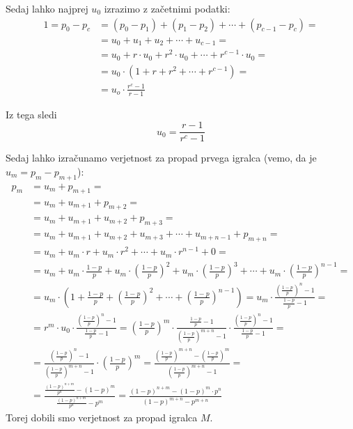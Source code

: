 \documentclass[12pt, a4paper]{article}
\begin{document}
Sedaj lahko najprej $u_0$ izrazimo z začetnimi podatki:
\begin{equation*}
\begin{split}
1 = p_0 - p_c &= (p_0 - p_1) + (p_1 - p_2) + \cdots +               (p_{c-1} - p_c) = \\
        &= u_0 + u_1 + u_2 + \cdots + u_{c-1} = \\
        &= u_0 + r \cdot u_0 + r^2 \cdot u_0 + \cdots + r^{c-1} \cdot u_0 = \\
        &= u_0 \cdot (1 + r + r^2 + \cdots + r^{c-1}) = \\
        &= u_o \cdot \frac{r^c - 1}{r-1}
\end{split}
\end{equation*} 

Iz tega sledi $$u_0 = \frac{r-1}{r^c -1}$$

Sedaj lahko izračunamo verjetnost za propad prvega igralca (vemo, da je $u_m = p_m - p_{m+1}$):
\begin{equation*}
\begin{split}
p_m &= u_m + p_{m+1} = \\
    &= u_m + u_{m+1} + p_{m+2} = \\
    &= u_m + u_{m+1} + u_{m+2} + p_{m+3} = \\
    &= u_m + u_{m+1} + u_{m+2} + u_{m+3} + \cdots + u_{m+n-1} + p_{m+n} = \\
    &= u_m + u_m \cdot r + u_m \cdot r^2 + \cdots + u_m \cdot r^{n-1} + 0 = \\
    &= u_m + u_m \cdot \frac{1-p}{p} + u_m \cdot (\frac{1-p}{p})^2 + u_m \cdot (\frac{1-p}{p})^3 + \cdots + u_m \cdot (\frac{1-p}{p})^{n-1} = \\
    &= u_m \cdot (1 + \frac{1-p}{p} + (\frac{1-p}{p})^2 + \cdots + (\frac{1-p}{p})^{n-1}) 
    = u_m \cdot \frac{(\frac{1-p}{p})^n - 1}{\frac{1-p}{p} - 1} = \\
    &= r^m \cdot u_0 \cdot \frac{(\frac{1-p}{p})^n - 1}{\frac{1-p}{p} - 1}  
    = (\frac{1-p}{p})^m \cdot \frac{\frac{1-p}{p} - 1}{(\frac{1-p}{p})^{m+n} -1}\cdot \frac{(\frac{1-p}{p})^n - 1}{\frac{1-p}{p} - 1} = \\
    &= \frac{(\frac{1-p}{p})^n - 1}{(\frac{1-p}{p})^{m+n} -1} \cdot (\frac{1-p}{p})^m 
    = \frac{(\frac{1-p}{p})^{m+n} - (\frac{1-p}{p})^m}{(\frac{1-p}{p})^{m+n} -1} = \\
    &= \frac{\frac{(1-p)^{n+m}}{p^n} - (1-p)^m}{\frac{(1-p)^{n+m}}{p^n} - p^m} = 
    \frac{(1-p)^{n+m} - (1-p)^m \cdot p^n}{(1-p)^{m+n} - p^{m+n}}
\end{split} 
\end{equation*}
Torej dobili smo verjetnost za propad igralca $M$.
\end{document}
